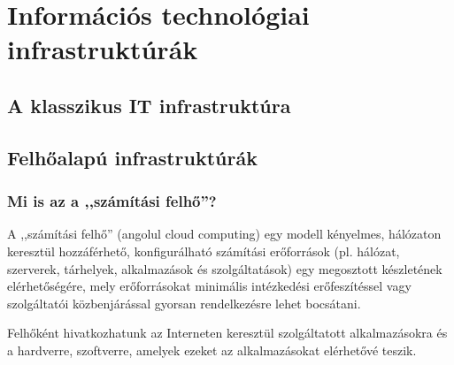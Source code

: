 \chapter{Információs technológiai infrastruktúrák}
\section{A klasszikus IT infrastruktúra}
\section{Felhőalapú infrastruktúrák}
\subsection{Mi is az a ,,számítási felhő''?}

A ,,számítási felhő'' (angolul \foreignlanguage{english}{cloud computing}) egy modell kényelmes, hálózaton keresztül hozzáférhető, konfigurálható számítási erőforrások (pl. hálózat, szerverek, tárhelyek, alkalmazások és szolgáltatások) egy megosztott készletének elérhetőségére, mely erőforrásokat minimális intézkedési erőfeszítéssel vagy szolgáltatói közbenjárással gyorsan rendelkezésre lehet bocsátani.


\begin{comment}
Cloud computing is a model for enabling ubiquitous, convenient, on-demand network access to a shared pool of configurable computing resources (e.g., networks, servers, storage, applications, and services) that can be rapidly provisioned and released with minimal management effort or service provider interaction. 
\end{comment}

\begin{comment}
The NIST Definition of Cloud Computing
Peter Mell 
Timothy Grance
September 2011
\end{comment}

Felhőként hivatkozhatunk az Interneten keresztül szolgáltatott alkalmazásokra és a hardverre, szoftverre, amelyek ezeket az alkalmazásokat elérhetővé teszik.

